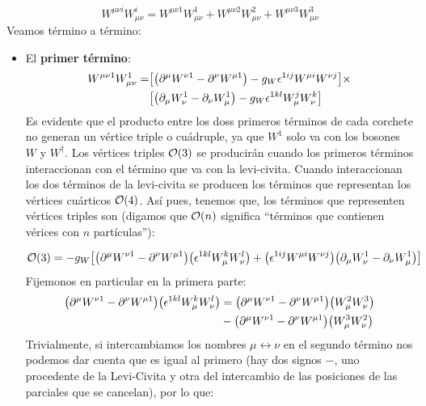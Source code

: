 \begin{equation}
	W^{\mu \nu i} W_{\mu \nu}^i = 
	W^{\mu \nu 1} W_{\mu \nu}^1 +
	W^{\mu \nu 2} W_{\mu \nu}^2 +
	W^{\mu \nu 3} W_{\mu \nu}^3
\end{equation}
Veamos término a término: 

\begin{itemize}
	\item El \textbf{primer término}: 
	\begin{align}  
		W^{\mu \nu 1} W_{\mu \nu}^1 = & \bqty{\pqty{\partial^\mu W^{\nu 1} - \partial^\nu W^{\mu 1}} - g_W \epsilon^{1ij} W^{\mu i} W^{\nu j}} \times \nonumber \\
		& \bqty{\pqty{\partial_\mu W^1_\nu - \partial_\nu W^1_\mu} - g_W 	\epsilon^{1kl} W^j_\mu W^k_\nu} \label{Ec:ej10-02}
	\end{align}
	Es evidente que el producto entre los doss primeros términos de cada corchete no generan un vértice triple o cuádruple, ya que $W^1$ solo va con los bosones $W$ y $W^\dagger$. Los vértices triples $\mathcal{O}(3)$ se producirán cuando los primeros términos interaccionan con el término que va con la levi-civita. Cuando interaccionan los dos términos de la levi-civita se producen los términos que representan los vértices cuárticos $\mathcal{O}(4)$. Así pues, tenemos que, los términos que representen vértices triples son (digamos que $\mathcal{O}(n)$ significa ``términos que contienen vérices con $n$ partículas''):

	\begin{equation} \small
		\Ocal(3) = - g_W \bqty{\pqty{\partial^\mu W^{\nu 1} - \partial^\nu W^{\mu 1}}\pqty{\epsilon^{1kl} W^k_\mu W^l_\nu} + \pqty{ \epsilon^{1ij} W^{\mu i} W^{\nu j}} \pqty{\partial_\mu W^1_\nu - \partial_\nu W^1_\mu}}
	\end{equation}
	Fijemonos en particular en la primera parte: 
	\begin{align}
		\pqty{\partial^\mu W^{\nu 1} - \partial^\nu W^{\mu 1}}\pqty{\epsilon^{1kl} W^k_\mu W^l_\nu} &  =  
		\pqty{\partial^\mu W^{\nu 1} - \partial^\nu W^{\mu 1}}\pqty{ W^2_\mu W^3_\nu} \nonumber \\ & -
		\pqty{\partial^\mu W^{\nu 1} - \partial^\nu W^{\mu 1}}\pqty{ W^3_\mu W^2_\nu} 
	\end{align}
	Trivialmente, si intercambiamos los nombres $\mu \leftrightarrow \nu$ en el segundo término nos podemos dar cuenta que es igual al primero (hay dos signos $-$, uno procedente de la Levi-Civita y otra del intercambio de las posiciones de las parciales que se cancelan), por lo que: 


\end{itemize}
